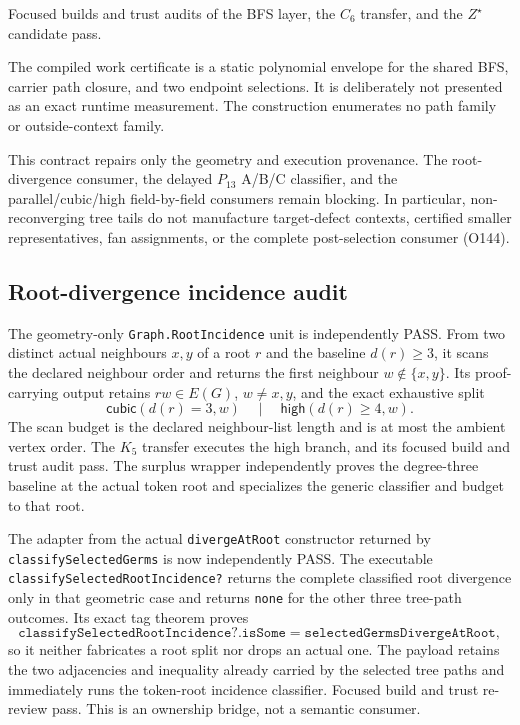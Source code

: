 \documentclass[11pt]{article}
\begin{document}
Focused builds and trust audits of the BFS layer, the $C_6$ transfer, and the
$Z^\star$ candidate pass.

The compiled work certificate is a static polynomial envelope for the shared
BFS, carrier path closure, and two endpoint selections.  It is deliberately
not presented as an exact runtime measurement.  The construction enumerates
no path family or outside-context family.

This contract repairs only the geometry and execution provenance.  The
root-divergence consumer, the delayed $P_{13}$ A/B/C classifier, and the
parallel/cubic/high field-by-field consumers remain blocking.  In particular,
non-reconverging tree tails do not manufacture target-defect contexts,
certified smaller representatives, fan assignments, or the complete
post-selection consumer (O144).

\subsection*{Root-divergence incidence audit}
The geometry-only \texttt{Graph.RootIncidence} unit is independently PASS.
From two distinct actual neighbours $x,y$ of a root $r$ and the baseline
$d(r)\ge3$, it scans the declared neighbour order and returns the first
neighbour $w\notin\{x,y\}$.  Its proof-carrying output retains $rw\in E(G)$,
$w\ne x,y$, and the exact exhaustive split
\[
 \mathsf{cubic}(d(r)=3,w)
 \quad\mid\quad
 \mathsf{high}(d(r)\ge4,w).
\]
The scan budget is the declared neighbour-list length and is at most the
ambient vertex order.  The $K_5$ transfer executes the high branch, and its
focused build and trust audit pass.  The surplus wrapper independently proves
the degree-three baseline at the actual token root and specializes the generic
classifier and budget to that root.

The adapter from the actual \texttt{divergeAtRoot} constructor returned by
\texttt{classifySelectedGerms} is now independently PASS.  The executable
\texttt{classifySelectedRootIncidence?} returns the complete classified root
divergence only in that geometric case and returns \texttt{none} for the other
three tree-path outcomes.  Its exact tag theorem proves
\[
 \texttt{classifySelectedRootIncidence?.isSome}
 =\texttt{selectedGermsDivergeAtRoot},
\]
so it neither fabricates a root split nor drops an actual one.  The payload
retains the two adjacencies and inequality already carried by the selected
tree paths and immediately runs the token-root incidence classifier.  Focused
build and trust re-review pass.  This is an ownership bridge, not a semantic
consumer.
\end{document}
